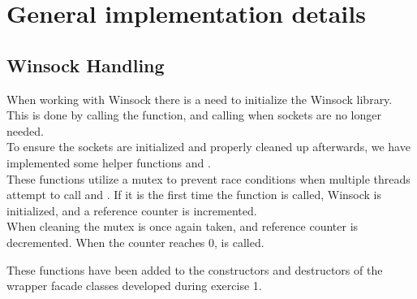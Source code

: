 \documentclass[Main]{subfiles}
\begin{document}
\section{General implementation details}\label{sec:generalImpDetails}

\subsection{Winsock Handling}
When working with Winsock there is a need to initialize the Winsock library.
This is done by calling the  function, and calling  when sockets are no longer needed.\\
To ensure the sockets are initialized and properly cleaned up afterwards, 
we have implemented some helper functions  and .\\
These functions utilize a mutex to prevent race conditions when multiple threads attempt to call  and .
If it is the first time the function is called, Winsock is initialized, and a reference counter is incremented.\\
When cleaning the mutex is once again taken, and reference counter is decremented. When the counter reaches 0,  is called.

These functions have been added to the constructors and destructors of the wrapper facade classes developed during exercise 1.
\end{document}
